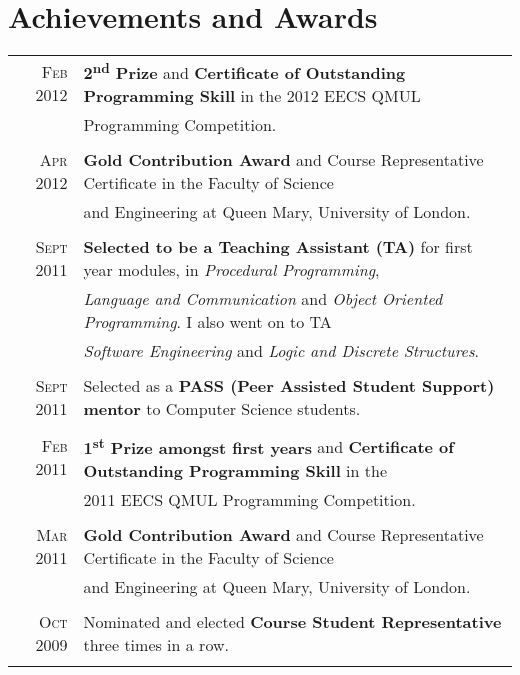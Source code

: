 \documentclass[a4paper,10pt]{article}
\begin{document}
\section{Achievements and Awards}
\begin{tabular}{rl}
  \textsc{Feb} 2012 & \textbf{2\textsuperscript{nd}  Prize} and \textbf{Certificate of Outstanding
  Programming Skill} in the 2012 EECS QMUL\\& Programming Competition.\\\\

  \textsc{Apr} 2012 & \textbf{Gold Contribution Award} and Course Representative Certificate in the
  Faculty of Science\\& and Engineering at Queen Mary, University of London.\\\\

  \textsc{Sept} 2011 & \textbf{Selected to be a Teaching Assistant (TA)} for first year modules, in
  \textit{Procedural Programming},\\& \textit{Language and  Communication} and \textit{Object
  Oriented Programming}. I also went on to TA\\& \textit{Software Engineering} and \textit{Logic
  and Discrete Structures}.\\\\

  \textsc{Sept} 2011 & Selected as a \textbf{PASS (Peer Assisted Student Support) mentor} to
  Computer Science students.\\\\

  \textsc{Feb} 2011 & \textbf{1\textsuperscript{st} Prize amongst first years} and
  \textbf{Certificate of Outstanding Programming Skill} in the\\& 2011 EECS QMUL Programming
  Competition.\\\\

  \textsc{Mar} 2011 & \textbf{Gold Contribution Award} and Course Representative Certificate in the
  Faculty of Science\\& and Engineering at Queen Mary, University of London.\\\\

  \textsc{Oct} 2009 & Nominated and elected \textbf{Course Student Representative} three times in a
  row.\\\\


\end{tabular}
\end{document}
